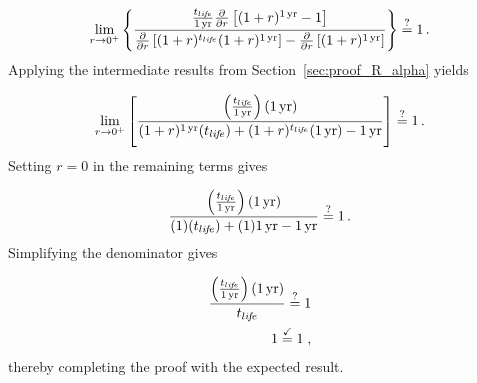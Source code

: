 \begin{equation}
  \lim_{r \to 0^+} 
  \left\{
    \frac{\frac{t_{li\!f\!e}}{1\,\mathrm{yr}}
      \frac{\partial}{\partial r} 
        \left[ (1 + r)^{1\,\mathrm{yr}} - 1 \right]}
    {\frac{\partial}{\partial r} \left[ (1 + r)^{t_{li\!f\!e}} (1 + r)^{1\,\mathrm{yr}} \right] - 
     \frac{\partial}{\partial r} \left[ (1 + r)^{1\,\mathrm{yr}} \right]}
  \right\} \stackrel{?}{=} 1 \, .
\end{equation}
%
Applying the intermediate results from Section~\ref{sec:proof_R_alpha} yields

\begin{equation}
  \lim_{r \to 0^+} 
  \left[
    \frac{\left(\frac{t_{li\!f\!e}}{1\,\mathrm{yr}}\right) (1\,\mathrm{yr})}
         {(1 + r)^{1\,\mathrm{yr}} (t_{li\!f\!e}) + 
          (1 + r)^{t_{li\!f\!e}} (1\,\mathrm{yr}) - 
          1\,\mathrm{yr}}
  \right] \stackrel{?}{=} 1 \, .
\end{equation}
%
Setting $r = 0$ in the remaining terms gives

\begin{equation}
  \frac{\left( \frac{t_{li\!f\!e}}{1\,\mathrm{yr}} \right) (1\,\mathrm{yr})}
  {(1) (t_{li\!f\!e}) + (1) 1\,\mathrm{yr} - 1\,\mathrm{yr}} \stackrel{?}{=} 1 \, .
\end{equation}
%
Simplifying the denominator gives

\begin{align}
  \frac{\left( \frac{t_{li\!f\!e}}{1\,\mathrm{yr}} \right) (1\,\mathrm{yr})}
       {t_{li\!f\!e}} \stackrel{?}{=} 1 \\
       1 \stackrel{\checkmark}{=} 1 \; ,
\end{align}
%
thereby completing the proof with the expected result.

